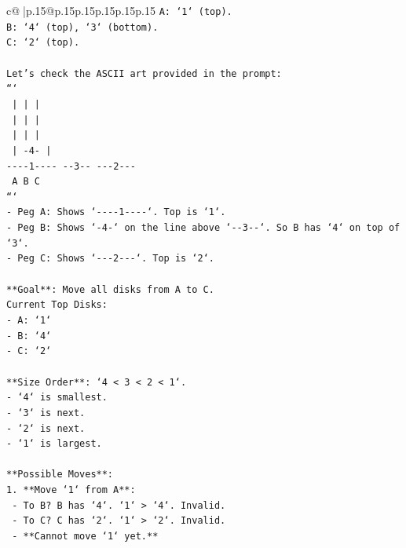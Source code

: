 \documentclass{article}
\begin{document}
{\begin{supertabular}{c@{$\;$}|p{.15\linewidth}@{}p{.15\linewidth}p{.15\linewidth}p{.15\linewidth}p{.15\linewidth}p{.15\linewidth}}
{{{\texttt{A: `1` (top).} \\
\texttt{B: `4` (top), `3` (bottom).} \\
\texttt{C: `2` (top).} \\
\\ 
\texttt{Let's check the ASCII art provided in the prompt:} \\
\texttt{```} \\
\texttt{    |         |         |    } \\
\texttt{    |         |         |    } \\
\texttt{    |         |         |    } \\
\texttt{    |        {-}4{-}        |    } \\
\texttt{{-}{-}{-}{-}1{-}{-}{-}{-}   {-}{-}3{-}{-}    {-}{-}{-}2{-}{-}{-} } \\
\texttt{    A         B         C    } \\
\texttt{```} \\
\texttt{{-} Peg A: Shows `{-}{-}{-}{-}1{-}{-}{-}{-}`. Top is `1`.} \\
\texttt{{-} Peg B: Shows `{-}4{-}` on the line above `{-}{-}3{-}{-}`. So B has `4` on top of `3`.} \\
\texttt{{-} Peg C: Shows `{-}{-}{-}2{-}{-}{-}`. Top is `2`.} \\
\\ 
\texttt{**Goal**: Move all disks from A to C.} \\
\texttt{Current Top Disks:} \\
\texttt{{-} A: `1`} \\
\texttt{{-} B: `4`} \\
\texttt{{-} C: `2`} \\
\\ 
\texttt{**Size Order**: `4 < 3 < 2 < 1`.} \\
\texttt{{-} `4` is smallest.} \\
\texttt{{-} `3` is next.} \\
\texttt{{-} `2` is next.} \\
\texttt{{-} `1` is largest.} \\
\\ 
\texttt{**Possible Moves**:} \\
\texttt{1. **Move `1` from A**:} \\
\texttt{   {-} To B? B has `4`. `1` > `4`. Invalid.} \\
\texttt{   {-} To C? C has `2`. `1` > `2`. Invalid.} \\
\texttt{   {-} **Cannot move `1` yet.**} \\
}}}
\end{supertabular}}
\end{document}
